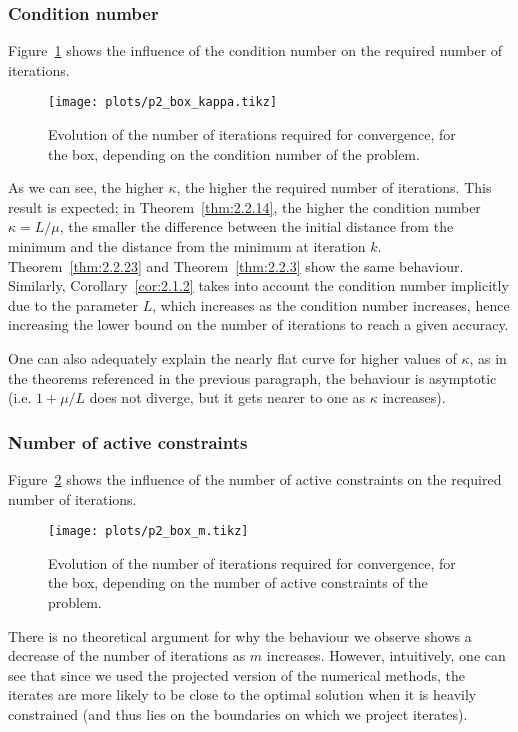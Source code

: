 \documentclass[final]{aomart}
\newtheorem[{}\it]{thm}{Theorem}[section]
\theoremstyle{definition}
\newtheorem*[{}\it]{notation}{Notation}
\numberwithin{equation}{section}
\newcommand{\thmref}[1]{Theorem~\ref{#1}}
\begin{document}
\subsubsection{Condition number}
Figure~\ref{fig:p2_box_kappa} shows the influence of the condition number on the required number of iterations.
\begin{figure}[!hbtp]
	\centering
	\texttt{[image: plots/p2\_box\_kappa.tikz]}
	\caption{Evolution of the number of iterations required for convergence, for the box, depending on the condition number of the problem.}
	\label{fig:p2_box_kappa}
\end{figure}

As we can see, the higher \(\kappa\), the higher the required number of iterations.
This result is expected; in \thmref{thm:2.2.14}, the higher the condition number \(\kappa = L/\mu\), the smaller the difference between the initial distance from the minimum and the distance from the minimum at iteration \(k\).
\thmref{thm:2.2.23} and \thmref{thm:2.2.3} show the same behaviour.
Similarly, Corollary~\ref{cor:2.1.2} takes into account the condition number implicitly due to the parameter \(L\), which increases as the condition number increases, hence increasing the lower bound on the number of iterations to reach a given accuracy.

One can also adequately explain the nearly flat curve for higher values of \(\kappa\), as in the theorems referenced in the previous paragraph, the behaviour is asymptotic (i.e. \(1 + \mu/L\) does not diverge, but it gets nearer to one as \(\kappa\) increases).

\subsubsection{Number of active constraints}
Figure~\ref{fig:p2_box_m} shows the influence of the number of active constraints on the required number of iterations.
\begin{figure}[!hbtp]
	\centering
	\texttt{[image: plots/p2\_box\_m.tikz]}
	\caption{Evolution of the number of iterations required for convergence, for the box, depending on the number of active constraints of the problem.}
	\label{fig:p2_box_m}
\end{figure}

There is no theoretical argument for why the behaviour we observe shows a decrease of the number of iterations as \(m\) increases.
However, intuitively, one can see that since we used the projected version of the numerical methods, the iterates are more likely to be close to the optimal solution when it is heavily constrained (and thus lies on the boundaries on which we project iterates).
\end{document}
